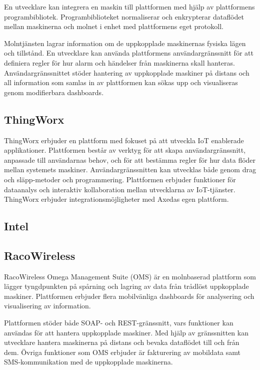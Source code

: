 En utvecklare kan integrera en maskin till plattformen med hjälp av plattformens
programbibliotek. Programbiblioteket normaliserar och enkrypterar
dataflödet mellan maskinerna och molnet i enhet med plattformens eget
protokoll. \cite{axeda}

Molntjänsten lagrar information om de uppkopplade maskinernas fysiska lägen och
tillstånd. En utvecklare kan använda plattformens användargränssnitt för att
definiera regler för hur alarm och händelser från maskinerna skall hanteras.
Användargränssnittet stöder hantering av uppkopplade maskiner på distans och
all information som samlas in av plattformen kan sökas upp och visualiseras
genom modifierbara dashboards. \cite{axeda}


\subsection{ThingWorx}
ThingWorx erbjuder en plattform med fokuset på att utveckla IoT enablerade
applikationer. Plattformen består av verktyg för att skapa användargränssnitt,
anpassade till användarnas behov, och för att bestämma regler för hur
data flöder mellan systemets maskiner. Användargränssnitten kan utvecklas
både genom drag och släpp-metoder och programmering.
Plattformen erbjuder funktioner för dataanalys och interaktiv kollaboration
mellan utvecklarna av IoT-tjänster.
ThingWorx erbjuder integrationsmöjligheter med Axedas egen plattform.


\subsection{Intel}

\subsection{RacoWireless}
RacoWireless Omega Management Suite (OMS) är en molnbaserad plattform som lägger 
tyngdpunkten på spårning och lagring av data från trådlöst uppkopplade maskiner.
Plattformen erbjuder flera mobilvänliga dashboards för analysering och 
visualisering av information. \cite{racowireless}

Plattformen stöder både SOAP- och REST-gränssnitt, vars funktioner kan
användas för att hantera uppkopplade maskiner. Med hjälp av gränssnitten kan 
utvecklare hantera maskinerna på distans och bevaka dataflödet till och från
dem. Övriga funktioner som OMS erbjuder är fakturering av mobildata samt
SMS-kommunikation med de uppkopplade maskinerna. \cite{racowireless}

